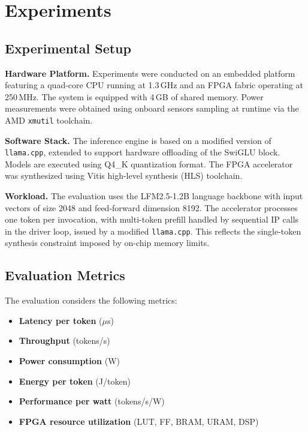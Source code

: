 \documentclass[conference]{IEEEtran}
\begin{document}
\section{Experiments} \label{sec:experiments}

\subsection{Experimental Setup}

\textbf{Hardware Platform.} Experiments were conducted on an embedded platform featuring a quad-core CPU running at 1.3\,GHz and an FPGA fabric operating at 250\,MHz. The system is equipped with 4\,GB of shared memory. Power measurements were obtained using onboard sensors sampling at runtime via the AMD \texttt{xmutil} toolchain.

\textbf{Software Stack.} The inference engine is based on a modified version of \texttt{llama.cpp}, extended to support hardware offloading of the SwiGLU block. Models are executed using Q4\_K quantization format. The FPGA accelerator was synthesized using Vitis high-level synthesis (HLS) toolchain.

\textbf{Workload.} The evaluation uses the LFM2.5-1.2B language backbone with input vectors of size 2048 and feed-forward dimension 8192. The accelerator processes one token per invocation, with multi-token prefill handled by sequential IP calls in the driver loop, issued by a modified \texttt{llama.cpp}. This reflects the single-token synthesis constraint imposed by on-chip memory limits. 

\subsection{Evaluation Metrics}

The evaluation considers the following metrics:

\begin{itemize}
    \item \textbf{Latency per token} ($\mu$s)
    \item \textbf{Throughput} (tokens/s)
    \item \textbf{Power consumption} (W)
    \item \textbf{Energy per token} (J/token)
    \item \textbf{Performance per watt} (tokens/s/W)
    \item \textbf{FPGA resource utilization} (LUT, FF, BRAM, URAM, DSP)
\end{itemize}
\end{document}
